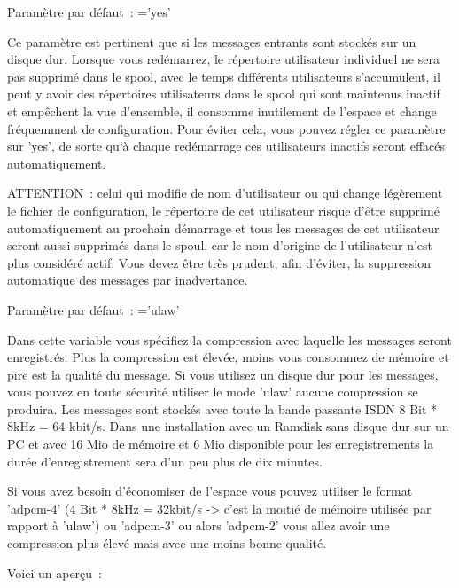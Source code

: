 \begin{description}
    Paramètre par défaut~: ='yes'

    Ce paramètre est pertinent que si les messages entrants sont stockés sur un disque dur. Lorsque
	vous redémarrez, le répertoire utilisateur individuel ne sera pas supprimé dans le spool, avec
	le temps différents utilisateurs s'accumulent, il peut y avoir des répertoires utilisateurs
	dans le spool qui sont maintenus inactif et empêchent la vue d'ensemble, il consomme inutilement
	de l'espace et change fréquemment de configuration. Pour éviter cela, vous pouvez régler ce paramètre
	sur 'yes', de sorte qu'à chaque redémarrage ces utilisateurs inactifs seront effacés automatiquement.

    ATTENTION~: celui qui modifie de nom d'utilisateur ou qui change légèrement le fichier de
	configuration, le répertoire de cet utilisateur risque d'être supprimé automatiquement au prochain
	démarrage et tous les messages de cet utilisateur seront aussi supprimés dans le spoul, car le nom
	d'origine de l'utilisateur n'est plus considéré actif. Vous devez être très prudent, afin d'éviter,
	la suppression automatique des messages par inadvertance.


    Paramètre par défaut~: ='ulaw'

    Dans cette variable vous spécifiez la compression avec laquelle les messages seront enregistrés.
	Plus la compression est élevée, moins vous consommez de mémoire et pire est la qualité du message.
	Si vous utilisez un disque dur pour les messages, vous pouvez en toute sécurité utiliser le mode
	'ulaw' aucune compression se produira. Les messages sont stockés avec toute la bande passante ISDN
	8 Bit * 8kHz = 64 kbit/s. Dans une installation avec un Ramdisk sans disque dur sur un PC et avec
	16 Mio de mémoire et 6 Mio disponible pour les enregistrements la durée d'enregistrement sera d'un
	peu plus de dix minutes.

    Si vous avez besoin d'économiser de l'espace vous pouvez utiliser le format 'adpcm-4'
	(4 Bit * 8kHz = 32kbit/s -> c'est la moitié de mémoire utilisée par rapport à 'ulaw') ou
	'adpcm-3' ou alors 'adpcm-2' vous allez avoir une compression plus élevé mais avec une
	 moins bonne qualité.

    Voici un aperçu~:


\end{description}
